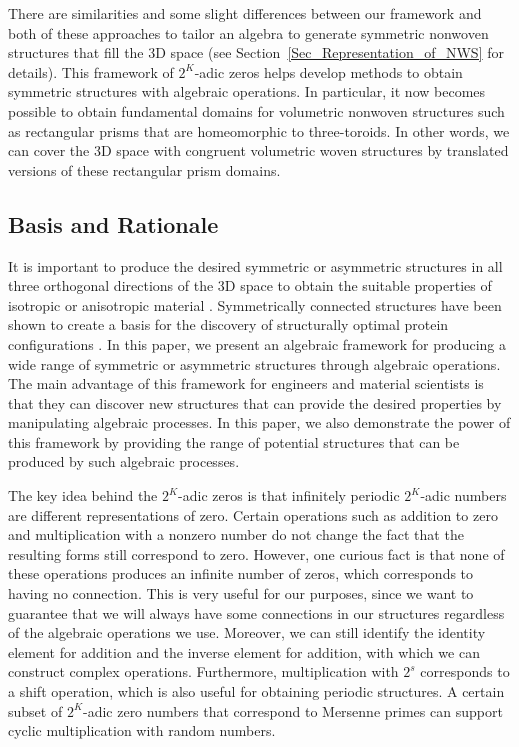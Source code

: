 \documentclass[times,twocolumn,final]{elsarticle}
\begin{document}
There are similarities and some slight differences between our framework and both of these approaches to tailor an algebra to generate symmetric nonwoven structures that fill the 3D space (see Section~\ref{Sec_Representation_of_NWS} for details). This framework of $2^K$-adic zeros helps develop methods to obtain symmetric structures with algebraic operations. In particular, it now becomes possible to obtain fundamental domains for volumetric nonwoven structures such as rectangular prisms that are homeomorphic to three-toroids. In other words, we can cover the 3D space with congruent volumetric woven structures by translated versions of these rectangular prism domains. 

\subsection{Basis and Rationale}
\label{Sec_BasisAndRationale}

It is important to produce the desired symmetric or asymmetric structures in all three orthogonal directions of the 3D space to obtain the suitable properties of isotropic or anisotropic material \cite{kumar2013axisymmetric}. Symmetrically connected structures have been shown to create a basis for the discovery of structurally optimal protein configurations \cite{Ramakrishnan1995latticechain, istrail2009combinatorial}. In this paper, we present an algebraic framework for producing a wide range of symmetric or asymmetric structures through algebraic operations. The main advantage of this framework for engineers and material scientists is that they can discover new structures that can provide the desired properties by manipulating algebraic processes. In this paper, we also demonstrate the power of this framework by providing the range of potential structures that can be produced by such algebraic processes. 

The key idea behind the $2^K$-adic zeros is that infinitely periodic $2^K$-adic numbers are different representations of zero. Certain operations such as addition to zero and multiplication with a nonzero number do not change the fact that the resulting forms still correspond to zero. However, one curious fact is that none of these operations produces an infinite number of zeros, which corresponds to having no connection. This is very useful for our purposes, since we want to guarantee that we will always have some connections in our structures regardless of the algebraic operations we use. Moreover, we can still identify the identity element for addition and the inverse element for addition, with which we can construct complex operations. Furthermore, multiplication with $2^s$ corresponds to a shift operation, which is also useful for obtaining periodic structures. A certain subset of $2^K$-adic zero numbers that correspond to Mersenne primes can support cyclic multiplication with random numbers. 
\end{document}
